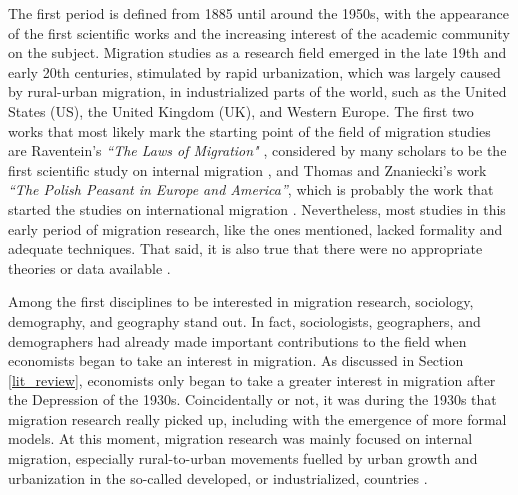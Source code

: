 The first period is defined from 1885 until around the 1950s, with the appearance of the first scientific works and the increasing interest of the academic community on the subject. Migration studies as a research field emerged in the late 19th and early 20th centuries, stimulated by rapid urbanization, which was largely caused by rural-urban migration, in industrialized parts of the world, such as the United States (US), the United Kingdom (UK), and Western Europe. The first two works that most likely mark the starting point of the field of migration studies are Raventein's \textit{``The Laws of Migration"} \citep{ravenstein_laws_1885, ravenstein_laws_1889}, considered by many scholars to be the first scientific study on internal migration \citep{scholten_introduction_2022, king_theories_2012, greenwood_early_2003, cohen_introduction_1996}, and Thomas and Znaniecki's work \textit{``The Polish Peasant in Europe and America''}, which is probably the work that started the studies on international migration  \citep{thomas_polish_1927, scholten_introduction_2022}. Nevertheless, most studies in this early period of migration research, like the ones mentioned, lacked formality and adequate techniques. That said, it is also true that there were no appropriate theories or data available \citep{greenwood_research_1975}.

Among the first disciplines to be interested in migration research, sociology, demography, and geography stand out. In fact, sociologists, geographers, and demographers had already made important contributions to the field when economists began to take an interest in migration. As discussed in Section \ref{lit_review}, economists only began to take a greater interest in migration after the Depression of the 1930s. Coincidentally or not, it was during the 1930s that migration research really picked up, including with the emergence of more formal models. At this moment, migration research was mainly focused on internal migration, especially rural-to-urban movements fuelled by urban growth and urbanization in the so-called developed, or industrialized, countries \citep{greenwood_early_2003}.

